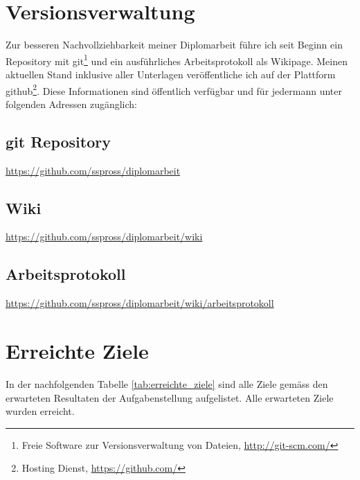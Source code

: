 \section{Versionsverwaltung}
Zur besseren Nachvollziehbarkeit meiner Diplomarbeit führe ich seit Beginn
ein Repository mit git\footnote{Freie Software zur Versionsverwaltung von Dateien,
\url{http://git-scm.com/}} und ein ausführliches Arbeitsprotokoll als Wikipage.
Meinen aktuellen Stand inklusive aller Unterlagen veröffentliche ich auf der 
Plattform github\footnote{Hosting Dienst, \url{https://github.com/}}. Diese 
Informationen sind öffentlich verfügbar und für jedermann unter folgenden 
Adressen zugänglich:

\subsection{git Repository}
\url{https://github.com/sspross/diplomarbeit}

\subsection{Wiki}
\url{https://github.com/sspross/diplomarbeit/wiki}

\subsection{Arbeitsprotokoll}
\url{https://github.com/sspross/diplomarbeit/wiki/arbeitsprotokoll}

\section{Erreichte Ziele}
In der nachfolgenden Tabelle \ref{tab:erreichte_ziele} sind alle Ziele gemäss 
den erwarteten Resultaten der Aufgabenstellung aufgelistet. Alle 
erwarteten Ziele wurden erreicht.

